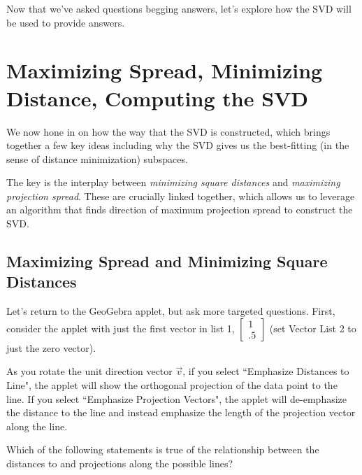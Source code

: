 \documentclass{ximera}
\begin{document}
Now that we've asked questions begging answers, let's explore how the SVD will be used to provide answers.

\section*{Maximizing Spread, Minimizing Distance, Computing the SVD}

We now hone in on how the way that the SVD is constructed, which brings together a few key ideas including why the SVD gives us the best-fitting (in the sense of distance minimization) subspaces. 

The key is the interplay between \emph{minimizing square distances} and \emph{maximizing projection spread}. These are crucially linked together, which allows us to leverage an algorithm that finds direction of maximum projection spread to construct the SVD. 

\subsection*{Maximizing Spread and Minimizing Square Distances}

Let's return to the GeoGebra applet, but ask more targeted questions. First, consider the applet with just the first vector in list 1, $\begin{bmatrix}
  1\\.5
\end{bmatrix}$ (set Vector List 2 to just the zero vector).

\begin{center}
\end{center}

As you rotate the unit direction vector $\vec{v}$, if you select ``Emphasize Distances to Line", the applet will show the orthogonal projection of the data point to the line. If you select ``Emphasize Projection Vectors", the applet will de-emphasize the distance to the line and instead emphasize the length of the projection vector along the line. 

Which of the following statements is true of the relationship between the distances to and projections along the possible lines?
\end{document}
